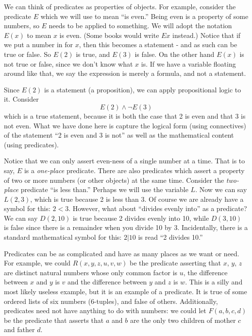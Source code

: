 \documentclass[12pt]{article}
\begin{document}
We can think of predicates as properties of objects.  For example, consider the predicate $E$ which we will use to mean ``is even.''  Being even is a property of some numbers, so $E$ needs to be applied to something.  We will adopt the notation $E(x)$ to mean $x$ is even.  (Some books would write $Ex$ instead.)  Notice that if we put a number in for $x$, then this becomes a statement - and as such can be true or false.  So $E(2)$ is true, and $E(3)$ is false.  On the other hand $E(x)$ is not true or false, since we don't know what $x$ is.  If we have a variable floating around like that, we say the expression is merely a formula, and not a statement.

Since $E(2)$ is a statement (a proposition), we can apply propositional logic to it.  Consider 
\[E(2) \wedge \neg E(3)\]
which is a true statement, because it is both the case that 2 is even and that 3 is not even.  What we have done here is capture the logical form (using connectives) of the statement ``2 is even and 3 is not'' as well as the mathematical content (using predicates).

Notice that we can only assert even-ness of a single number at a time.  That is to say, $E$ is a {\em one-place} predicate.  There are also predicates which assert a property of two or more numbers (or other objects) at the same time.  Consider the {\em two-place} predicate ``is less than.''  Perhaps we will use the variable $L$.  Now we can say $L(2,3)$, which is true because 2 is less than 3.  Of course we are already have a symbol for this: $2 < 3$.  However, what about ``divides evenly into'' as a predicate?  We can say $D(2,10)$ is true because 2 divides evenly into 10, while $D(3, 10)$ is false since there is a remainder when you divide 10 by 3.  Incidentally, there is a standard mathematical symbol for this: $2 | 10$ is read ``2 divides 10.''  

Predicates can be as complicated and have as many places as we want or need.  For example, we could $R(x,y,z,u,v,w)$ be the predicate asserting that $x$, $y$, $z$ are distinct natural numbers whose only common factor is $u$, the difference between $x$ and $y$ is $v$ and the difference between $y$ and $z$ is $w$.  This is a silly and most likely useless example, but it is an example of a predicate.  It is true of some ordered lists of six numbers (6-tuples), and false of others.  Additionally, predicates need not have anything to do with numbers: we could let $F(a,b,c,d)$ be the predicate that asserts that $a$ and $b$ are the only two children of mother $c$ and father $d$.
\end{document}
